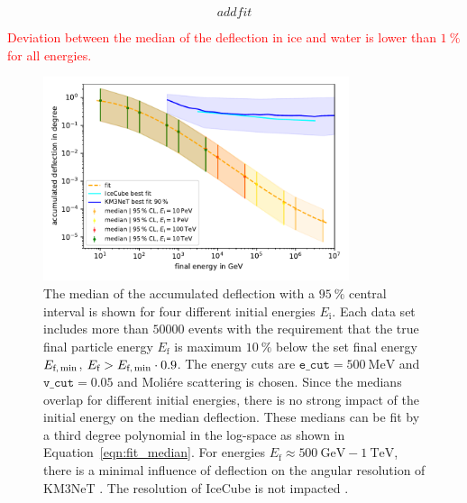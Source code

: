\begin{equation}
    add fit
    \label{eqn:fit_median}
\end{equation}

\textcolor{red}{Deviation between the median of the deflection in ice and water 
is lower than $\SI{1}{\percent}$ for all energies.}

\begin{figure}
    \centering 
    \includegraphics[width=0.8\textwidth]{figures/fit_median_defl_cut_10percent_only_poly.pdf}
    \caption{The median of the accumulated deflection with a $\SI{95}{\percent}$ 
    central interval is shown for four different initial energies $E_{\text{i}}$. 
    Each data set includes more than $\num{50000}$ events with the requirement 
    that the true final particle energy $E_{\text{f}}$ is maximum 
    $\SI{10}{\percent}$ below the set final energy $E_{\text{f,\,min}}$,   
    $E_{\text{f}} > E_{\text{f,\,min}} \cdot 0.9$. The energy cuts are $\texttt{e\_cut} = \SI{500}{\mega\electronvolt}$ and $\texttt{v\_cut} = 0.05$ and 
    Moliére scattering is chosen. 
    Since the medians overlap for different initial energies, there is no 
    strong impact of the initial energy on the median deflection. These 
    medians can be fit by a third degree polynomial in the log-space as 
    shown in Equation~\ref{eqn:fit_median}. For energies 
    $E_{\text{f}} \approx \SI{500}{\giga\electronvolt} - \SI{1}{\tera\electronvolt}$, there is a minimal influence of deflection on the angular resolution of 
    KM3NeT \cite{KM3NeT_Resolution2016}. The resolution of IceCube is not 
    impacted \cite{IceCube_Resolution2021}.}
    \label{fig:fit_median}
\end{figure}